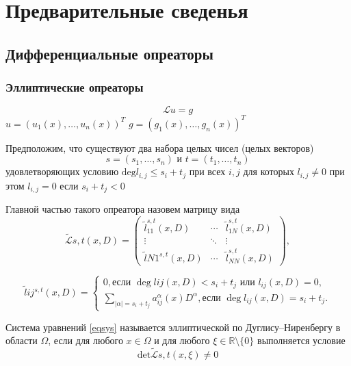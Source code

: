 \newpage

\section{Предварительные сведенья}
\subsection{Дифференциальные опреаторы}
\subsubsection{Эллиптические опреаторы}
\begin{equation}\label{eqsys}
   \mathcal{L}u = g
\end{equation}
$u = (u_1(x), \dots , u_n(x))^T$ $g = (g_1(x), \dots , g_n(x))^T$

Предположим, что существуют два набора целых чисел (целых векторов)
\begin{equation}
   s = (s_1, \dots, s_n) \text{ и } t = (t_1, \dots, t_n)
\end{equation}
удовлетворяющих условию $\text{deg}l_{i,j}\leq s_i + t_j$ при всех $i, j$ для которых $l_{i,j}\ne 0$ при этом 
$l_{i,j} = 0$ если $s_i+t_j < 0$

Главной частью такого опреатора назовем матрицу вида 
\begin{equation}
   \tilde{\mathcal{L}}{s,t}(x,D) =
   \begin{pmatrix}
   \tilde{l}_{11}^{s,t}(x,D) & \cdots & \tilde{l}_{1N}^{s,t}(x,D) \\
   \vdots & \ddots & \vdots \\
   \tilde{l}{N1}^{s,t}(x,D) & \cdots & \tilde{l}_{NN}^{s,t}(x,D)
   \end{pmatrix},
\end{equation}

\begin{equation}
   \tilde{l}{ij}^{s,t}(x,D) =
   \begin{cases}
   0, \text{если } \deg l{ij}(x,D) < s_i + t_j \text{ или } l_{ij}(x,D) = 0, \\
   \sum_{|\alpha|=s_i+t_j} a_{ij}^{\alpha}(x)D^{\alpha},  \text{если } \deg l_{ij}(x,D) = s_i + t_j.
   \end{cases}
\end{equation}

\begin{definition}
   Система уравнений \ref{eqsys} называется эллиптической по Дуглису–Ниренбергу в области $\Omega$,
   если для любого $x\in\Omega$ и для любого $\xi\in\mathbb{R}\setminus\{0\}$ выполняется условие 
   \begin{equation*}
      \text{det}\tilde{\mathcal{L}}{s,t}(x,\xi) \ne 0
   \end{equation*}
\end{definition}

